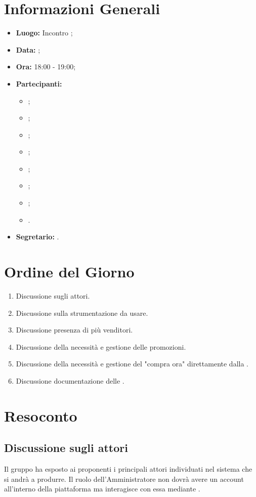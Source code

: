 \section{Informazioni Generali}
\begin{itemize}
\item \textbf{Luogo:} Incontro ;
\item \textbf{Data:} \Data;
\item \textbf{Ora:} 18:00 - 19:00;
\item \textbf{Partecipanti:}
	\begin{itemize}
		\item \BL{}; 
		\item \FF{};
		\item \MM{};
		\item \PC{};
		\item \TG{};
		\item \TL{};
		\item \VD{};
		\item \Proponente.
	\end{itemize}
\item \textbf{Segretario:} \PC{}.
\end{itemize}

\section{Ordine del Giorno}
\begin{enumerate}
	\item Discussione sugli attori.
	\item Discussione sulla strumentazione da usare.
	\item Discussione presenza di più venditori.
	\item Discussione della necessità e gestione delle promozioni.
	\item Discussione della necessità e gestione del "compra ora" direttamente dalla .
	\item Discussione documentazione delle .
\end{enumerate}

\section{Resoconto}
\subsection{Discussione sugli attori}
Il gruppo ha esposto ai proponenti i principali attori individuati nel sistema che si andrà a produrre. Il ruolo dell'Amministratore non dovrà avere un account all'interno della piattaforma ma interagisce con essa mediante .

